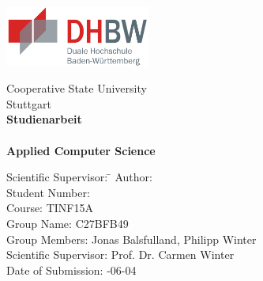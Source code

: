 \begin{titlepage}

\begin{minipage}{\textwidth}
		\vspace{-2cm}
		\noindent  \hfill   \includegraphics[height=2cm, keepaspectratio]{img/dhbw_logo.png}
		\vspace{1cm}
\end{minipage}
\vspace{1em}
\sffamily
\begin{center}
	\textsf{\large{}Cooperative State University\\[1.5mm] Stuttgart}\\[2em] \vspace{1cm}
	\textsf{\textbf{\Large{}Studienarbeit}}\\[3mm] \vspace{1cm}
	\textsf{\textbf{\dertitel}} \\[1.5cm]	\vspace{1cm}
	\textsf{\textbf{\Large{}Applied Computer Science}\\[3mm]}

	\vspace{2cm}
\vfill

\begin{minipage}{\textwidth}

\begin{tabbing}
	Scientific Supervisor: \hspace{0.85cm}\=\kill
	Author: \> \derautor \\[1.5mm]
	Student Number: \\[1.5mm]
	Course: \> TINF15A\\[1.5mm]
	Group Name: \> C27BFB49\\[1.5mm]
	Group Members: \> Jonas Balsfulland, Philipp Winter\\[1.5mm]
	Scientific Supervisor: \> Prof. Dr. Carmen Winter \\[1.5mm]
	Date of Submission: -06-04\\
\end{tabbing}
\end{minipage}

\end{center}

\end{titlepage}
